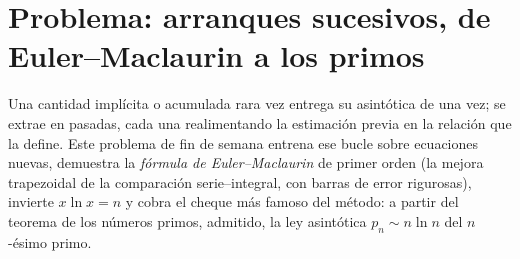 \section{Problema: arranques sucesivos, de Euler--Maclaurin a los
primos}

Una cantidad implícita o acumulada rara vez entrega su asintótica de
una vez; se extrae en pasadas, cada una realimentando la estimación
previa en la relación que la define. Este problema de fin de semana
entrena ese bucle sobre ecuaciones nuevas, demuestra la \emph{fórmula
de Euler--Maclaurin} de primer orden (la mejora trapezoidal de la
comparación serie--integral, con barras de error rigurosas), invierte
$x\ln x = n$ y cobra el cheque más famoso del método: a partir del
teorema de los números primos, admitido, la ley asintótica $p_n \sim
n\ln n$ del $n$-ésimo primo.

